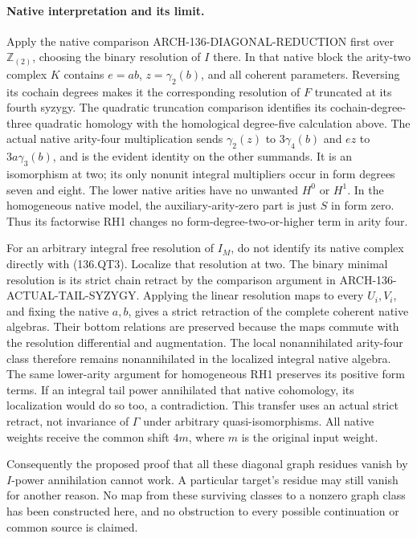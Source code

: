 \paragraph{Native interpretation and its limit.}
Apply the native comparison
ARCH-136-DIAGONAL-REDUCTION first over \(\mathbb Z_{(2)}\),
choosing the binary resolution of \(I\) there.  In that native
block the arity-two complex \(K\) contains \(e=ab\),
\(z=\gamma_2(b)\), and all coherent parameters.  Reversing
its cochain degrees makes it the corresponding resolution of
\(F\) truncated at its fourth syzygy.  The quadratic
truncation comparison identifies its cochain-degree-three
quadratic homology with the homological degree-five calculation
above.  The actual native arity-four multiplication sends
\(\gamma_2(z)\) to \(3\gamma_4(b)\) and \(ez\) to
\(3a\gamma_3(b)\), and is the evident identity on the other
summands.  It is an isomorphism at two; its only nonunit
integral multipliers occur in form degrees seven and eight.
The lower native arities have no unwanted \(H^0\) or \(H^1\).
In the homogeneous native model, the auxiliary-arity-zero
part is just \(S\) in form zero.  Thus its factorwise RH1
changes no form-degree-two-or-higher term in arity four.

For an arbitrary integral free resolution of \(I_M\), do not
identify its native complex directly with (136.QT3).  Localize
that resolution at two.  The binary minimal resolution is its
strict chain retract by the comparison argument in
ARCH-136-ACTUAL-TAIL-SYZYGY.  Applying the linear resolution
maps to every \(U_i,V_i\), and fixing the native \(a,b\),
gives a strict retraction of the complete coherent native
algebras.  Their bottom relations are preserved because the
maps commute with the resolution differential and augmentation.
The local nonannihilated arity-four class therefore remains
nonannihilated in the localized integral native algebra.
The same lower-arity argument for homogeneous RH1 preserves
its positive form terms.  If an integral tail power annihilated
that native cohomology, its localization would do so too,
a contradiction.  This transfer uses an actual strict retract,
not invariance of \(\Gamma\) under arbitrary quasi-isomorphisms.
All native weights receive the common shift \(4m\), where
\(m\) is the original input weight.

Consequently the proposed proof that all these diagonal graph
residues vanish by \(I\)-power annihilation cannot work.  A
particular target's residue may still vanish for another reason.
No map from these surviving classes to a nonzero graph class
has been constructed here, and no obstruction to every possible
continuation or common source is claimed.

